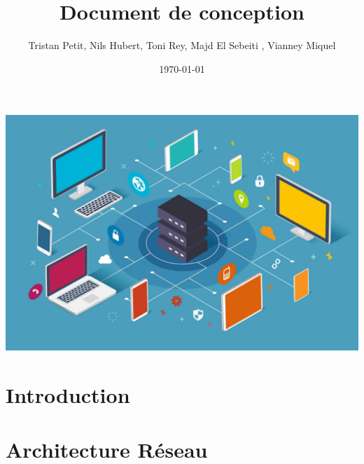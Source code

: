 \documentclass{article}
\begin{document}
\title{Document de conception}
\author{Tristan Petit, Nils Hubert, Toni Rey, 
 Majd El Sebeiti , Vianney Miquel}
\date{\today}
\maketitle
\begin{center}
    \vspace{1cm} %
    \includegraphics[width=1\textwidth]{images/Logo-project.jpeg} %
\end{center}

\maketitle


\newpage


\renewcommand{\contentsname}{Table des matières}

\tableofcontents

\newpage
{}

\section{Introduction}


\section{Architecture Réseau}
\end{document}

